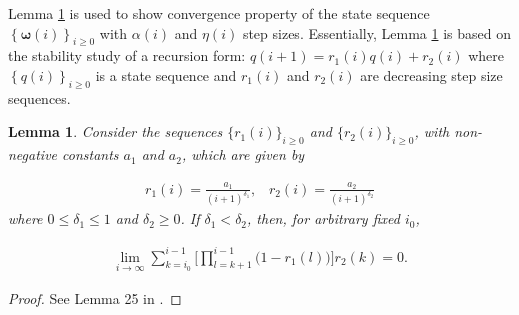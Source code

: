 \documentclass[journal]{IEEEtran}
\newtheorem{lemma}{Lemma}
\begin{document}
{}
{Lemma \ref{lemma1} is used to show convergence property of the state sequence $\left\{\bm{\omega}(i)\right\}_{i \ge 0}$ with $\alpha(i)$ and $\eta(i)$ step sizes. Essentially, Lemma \ref{lemma1} is based on the stability study of a recursion form: $q(i+1) = r_1(i)q(i) + r_2(i)$ where $\left\{q(i)\right\}_{i \ge 0}$ is a state sequence and $r_1(i)$ and $r_2(i)$ are decreasing step size sequences.}
\begin{lemma}
	Consider the sequences $\{r_1(i)\}_{i\ge 0}$ and $\{r_2(i)\}_{i\ge 0}$, with non-negative constants $a_1$ and $a_2$,  which are given by
	
	\vspace{-4mm}
	\small
	\begin{align}
	r_1(i) = \frac{a_1}{\left(i+1\right)^{\delta_1}},\,\,\,\,\,r_2(i) = \frac{a_2}{\left(i+1\right)^{\delta_2}} \label{eq:lemma1_r1r2}
	\end{align}
	\normalsize
	where $0 \le \delta_1 \le 1$ and $\delta_2 \ge 0$. If $\delta_1 < \delta_2$, then, for arbitrary fixed $i_0$,
	
	\vspace{-4mm}
	\small
	\begin{align}
	\lim\limits_{i \to \infty} \sum_{k = i_0}^{i-1} \Bigg[\prod_{l=k+1}^{i-1}\big(1-r_1(l)\big)\Bigg] r_2(k) = 0.\label{eq:lemma1:0}
	\end{align}
	\normalsize
	\label{lemma1}
\end{lemma}
\begin{proof}\vspace{-3mm}
	See Lemma 25 in \cite{Kar2012}. 
\end{proof}
\end{document}
